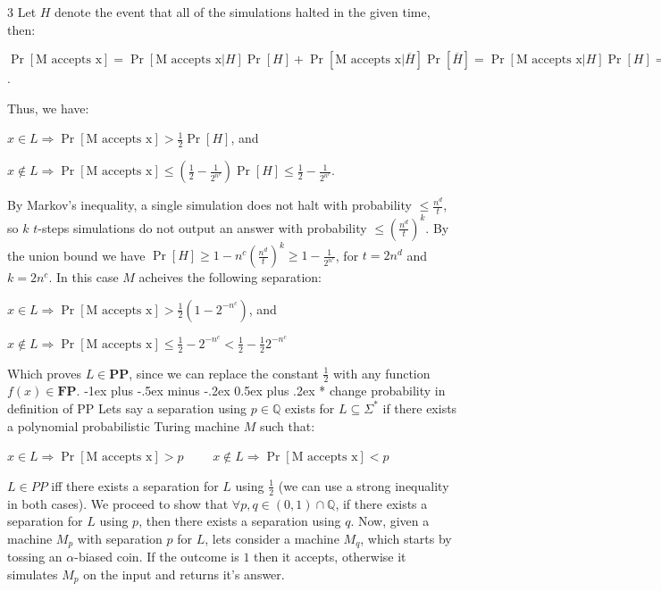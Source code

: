 \documentclass[10pt,landscape]{article}
\makeatletter
\theoremstyle{plain}%
\theoremstyle{definition}
\theoremstyle{remark}
\renewcommand{\section}{\@startsection{section}{1}{0mm}%
                                {-1ex plus -.5ex minus -.2ex}%
                                {0.5ex plus .2ex}%
                                {\normalfont\large\bfseries}}
\makeatother
\begin{document}
\begin{multicols}{3}
Let $H$ denote the event that all of the simulations halted in the given time, then:

$\Pr\left[\text{M accepts x}\right]=\Pr\left[\text{M accepts x} | H\right]\Pr[H]+\Pr\left[\text{M accepts x}\Big| \overline{H}\right]\Pr\left[\overline{H}\right]=\Pr\left[\text{M accepts x} | H\right]\Pr[H]=\Pr\left[M_{\mathcal{O}} \text{ accepts x}\right]\Pr[H]$.

Thus, we have:

$x\in L\Rightarrow \Pr\left[\text{M accepts x}\right]>\frac{1}{2}\Pr[H]$, and

$x\notin L\Rightarrow \Pr\left[\text{M accepts x}\right]\le\left(\frac{1}{2}-\frac{1}{2^{n^c}}\right)\Pr[H]\le \frac{1}{2}-\frac{1}{2^{n^c}}$.

By Markov's inequality, a single simulation does not halt with probability $\le \frac{n^d}{t}$, so $k$ $t$-steps simulations do not output an answer with probability $\le \left(\frac{n^{d}}{t}\right)^k$. By the union bound we have $\Pr[H]\ge 1-n^c\left(\frac{n^{d}}{t}\right)^k\ge 1-\frac{1}{2^{n^c}}$, for $t=2n^d$ and $k=2n^c$. In this case $M$ acheives the following separation:

$x\in L\Rightarrow \Pr\left[\text{M accepts x}\right]>\frac{1}{2}\left(1-2^{-n^c}\right)$, and

$x\notin L\Rightarrow \Pr\left[\text{M accepts x}\right]\le \frac{1}{2}-2^{-n^c}<\frac{1}{2}-\frac{1}{2}2^{-n^c}$

Which proves $L\in \textbf{PP}$, since we can replace the constant $\frac{1}{2}$ with any function $f(x)\in \textbf{FP}$.
\section*{ change probability in definition of PP }
Lets say a separation using $p\in\mathbb{Q}$ exists for $L\subseteq\Sigma^*$ if there exists a polynomial probabilistic Turing machine $M$ such that:

$x\in L \Rightarrow \Pr\left[\text{M accepts x}\right]> p \qquad$
$x\notin L \Rightarrow \Pr\left[\text{M accepts x}\right]< p$

$L\in PP$ iff there exists a separation for $L$ using $\frac{1}{2}$ (we can use a strong inequality in both cases). We proceed to show that $\forall p,q\in (0,1)\cap \mathbb{Q}$, if there exists a separation for $L$ using $p$, then there exists a separation using $q$.
Now, given a machine $M_p$ with separation $p$ for $L$, lets consider a machine $M_q$, which starts by tossing an $\alpha$-biased coin. If the outcome is $1$ then it accepts, otherwise it simulates $M_p$ on the input and returns it's answer. 


\end{multicols}
\end{document}

